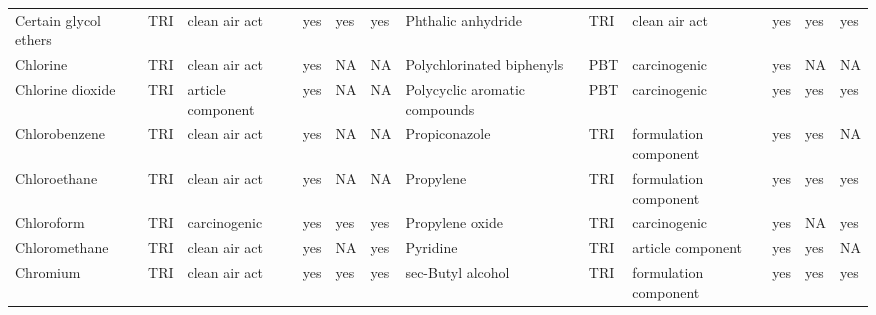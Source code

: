 \begin{table}[H]
{\begin{tabular}{llllllllllll}
            Certain glycol ethers                                                      & TRI            & clean air act         & yes    & yes     & yes  & Phthalic anhydride                                                                                                 & TRI            & clean air act & yes & yes & yes\\
            Chlorine                                                                   & TRI            & clean air act         & yes    & NA      & NA   & Polychlorinated biphenyls                                                                                          & PBT            & carcinogenic          & yes & NA & NA\\
            Chlorine dioxide                                                           & TRI            & article component     & yes    & NA      & NA   & Polycyclic aromatic compounds                                                                                      & PBT & carcinogenic & yes & yes & yes\\
            Chlorobenzene                                                              & TRI            & clean air act         & yes    & NA      & NA   & Propiconazole                                                                                                      & TRI            & formulation component & yes & yes & NA\\
            Chloroethane                                                               & TRI            & clean air act         & yes    & NA      & NA   & Propylene                                                                                                          & TRI            & formulation component & yes & yes & yes\\
            Chloroform                                                                 & TRI            & carcinogenic          & yes    & yes     & yes  & Propylene oxide                                                                                                    & TRI            & carcinogenic          & yes    & NA      & yes  \\
            Chloromethane                                                              & TRI            & clean air act         & yes    & NA      & yes  & Pyridine                                                                                                           & TRI            & article component     & yes    & yes & NA\\
            Chromium                                                                   & TRI            & clean air act         & yes    & yes     & yes  & sec-Butyl alcohol                                                                                                  & TRI            & formulation component & yes & yes & yes\\

\end{tabular}}
\end{table}
